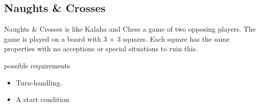 \subsection{Naughts \& Crosses}

Naughts \& Crosses is like Kalaha and Chess a game of two opposing players. The game is played on a board with 3 $\times$ 3 squares. Each square has the same properties with no acceptions or special situations to ruin this. 

possible requirements
\begin{itemize}[noitemsep]
	\item Turn-handling.
	\item A start condition 
\end{itemize}